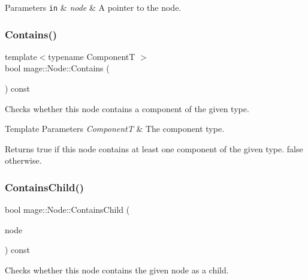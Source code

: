 \begin{DoxyParams}[1]{Parameters}
\mbox{\tt in}  & {\em node} & A pointer to the node. \\
\hline
\end{DoxyParams}
\hypertarget{classmage_1_1_node_ab3defd7329e8f87cff65cd8136c8f2d2}{}\label{classmage_1_1_node_ab3defd7329e8f87cff65cd8136c8f2d2} 
\subsubsection{\texorpdfstring{Contains()}{Contains()}}
{\footnotesize\ttfamily template$<$typename ComponentT $>$ \\
bool mage\+::\+Node\+::\+Contains (\begin{DoxyParamCaption}{ }\end{DoxyParamCaption}) const\hspace{0.3cm}{\ttfamily [noexcept]}}

Checks whether this node contains a component of the given type.


\begin{DoxyTemplParams}{Template Parameters}
{\em ComponentT} & The component type. \\
\hline
\end{DoxyTemplParams}
\begin{DoxyReturn}{Returns}
{\ttfamily true} if this node contains at least one component of the given type. {\ttfamily false} otherwise. 
\end{DoxyReturn}
\hypertarget{classmage_1_1_node_a2c1d85609b765c019a0a123f5f8a182a}{}\label{classmage_1_1_node_a2c1d85609b765c019a0a123f5f8a182a} 
\subsubsection{\texorpdfstring{Contains\+Child()}{ContainsChild()}}
{\footnotesize\ttfamily bool mage\+::\+Node\+::\+Contains\+Child (\begin{DoxyParamCaption}\item[{\hyperlink{classmage_1_1_proxy_ptr}{Proxy\+Ptr}$<$ const \hyperlink{classmage_1_1_node}{Node} $>$}]{node }\end{DoxyParamCaption}) const}

Checks whether this node contains the given node as a child.


